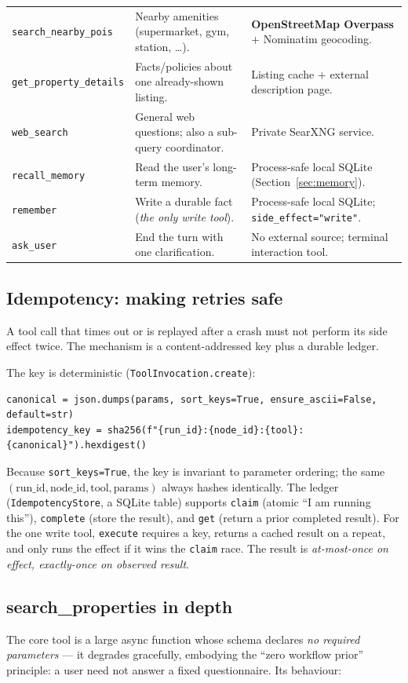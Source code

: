 \documentclass[11pt,a4paper]{article}
\newcommand{\code}[1]{\texttt{\small #1}}
\begin{document}
\begin{longtable}{@{}p{} p{} p{}@{}}
\code{search\_nearby\_pois} & Nearby amenities (supermarket, gym, station, \dots). & \textbf{OpenStreetMap Overpass} $+$ Nominatim geocoding.\\
\code{get\_property\_details} & Facts/policies about one already-shown listing. & Listing cache $+$ external description page.\\
\code{web\_search} & General web questions; also a sub-query coordinator. & Private SearXNG service.\\
\code{recall\_memory} & Read the user's long-term memory. & Process-safe local SQLite (Section~\ref{sec:memory}).\\
\code{remember} & Write a durable fact (\emph{the only write tool}). & Process-safe local SQLite; \code{side\_effect="write"}.\\
\code{ask\_user} & End the turn with one clarification. & No external source; terminal interaction tool.\\
\bottomrule
\end{longtable}

\subsection{Idempotency: making retries safe}
A tool call that times out or is replayed after a crash must not perform its side
effect twice. The mechanism is a content-addressed key plus a durable ledger.

The key is deterministic (\code{ToolInvocation.create}):
\begin{lstlisting}
canonical = json.dumps(params, sort_keys=True, ensure_ascii=False, default=str)
idempotency_key = sha256(f"{run_id}:{node_id}:{tool}:{canonical}").hexdigest()
\end{lstlisting}
Because \code{sort\_keys=True}, the key is invariant to parameter ordering; the same
$(\text{run\_id}, \text{node\_id}, \text{tool}, \text{params})$ always hashes
identically. The ledger (\code{IdempotencyStore}, a SQLite table) supports
\code{claim} (atomic ``I am running this''), \code{complete} (store the result), and
\code{get} (return a prior completed result). For the one write tool, \code{execute}
requires a key, returns a cached result on a repeat, and only runs the effect if it
wins the \code{claim} race. The result is \emph{at-most-once on effect,
exactly-once on observed result}.

\subsection{search\_properties in depth}
The core tool is a large async function whose schema declares \emph{no required
parameters} --- it degrades gracefully, embodying the ``zero workflow prior''
principle: a user need not answer a fixed questionnaire. Its behaviour:
\end{document}

